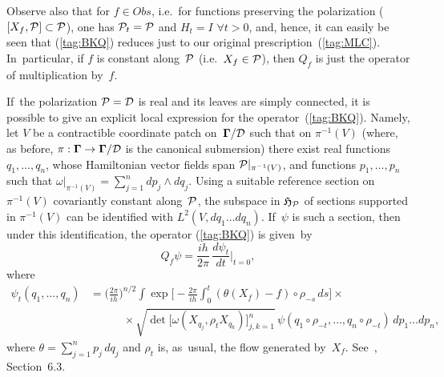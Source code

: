 \documentclass[11pt]{amsart}
\numberwithin{equation}{section}
\theoremstyle{remark}
\newcommand\Obs{Obs}
\newcommand\Omg{{\bigam}}   %
\newcommand\PP{{\Cal P}}
\newcommand\DD{{\Cal D}}
\newcommand\MD{{\Omg/\DD}}
\newcommand\HH{\mathfrak H}
\newcommand{\bigam}{\mbox{\boldmath $\Gamma$}}
\begin{document}
Observe also that for $f\in\Obs$, i.e.~for functions preserving the
polarization ($[X_f,\PP]\subset\PP$), one has $\PP_t=\PP$ and $H_t=I$ $\forall
t>0$, and, hence, it can easily be seen that (\ref{tag:BKQ}) reduces just to
our original prescription~(\ref{tag:MLC}). In~particular, if $f$ is constant
along~$\PP$ (i.e.~$X_f\in\PP$), then $Q_f$ is just the operator of
multiplication by~$f$.

If~the polarization $\PP=\DD$ is real and its leaves are simply connected, it
is possible to give an explicit local expression for the
operator~(\ref{tag:BKQ}). Namely, let $V$ be a contractible coordinate patch
on~$\MD$ such that on $\pi^{-1}(V)$ (where, as before, $\pi:\Omg\to\MD$ is the
canonical submersion) there exist real functions $q_1,\dots,q_n$, whose
Hamiltonian vector fields span $\PP|_{\pi^{-1}(V)}$, and functions
$p_1,\dots,p_n$ such that $\omega|_{\pi^{-1}(V)} = \sum_{j=1}^n dp_j\wedge
dq_j$. Using a suitable reference section on $\pi^{-1}(V)$ covariantly constant
along~$\PP$, the subspace in $\HH_\PP$ of sections supported in $\pi^{-1}(V)$
can be identified with $L^2(V,dq_1\dots dq_n)$. If~$\psi$ is such a section,
then under this identification, the operator (\ref{tag:BKQ}) is given~by
\begin{equation}  Q_f\psi = \frac{ih}{2\pi} \, \frac{d\psi_t}{dt} \bigg|_{t=0},
\label{tag:SNATa} \end{equation}
where
\begin{equation} \begin{aligned} \psi_t(q_1,\dots,q_n) &=
\bigg(\frac{2\pi}{ih}\bigg)^{n/2} \int
\exp\Big[-\frac{2\pi}{ih}\int_0^t (\theta(X_f)-f)\circ\rho_{-s}\,ds\Big]
\times {} \\ & \qquad\quad {}\times
\sqrt{\det\big[ \omega(X_{q_j},\rho_t X_{q_k}) \big]_{j,k=1}^n}
\,\psi(q_1\circ\rho_{-t},\dots,q_n\circ\rho_{-t}) \, dp_1 \dots dp_n,
\end{aligned}  \label{tag:SNATb}  \end{equation}
where $\theta=\sum_{j=1}^n p_j\,dq_j$ and $\rho_t$ is, as~usual, the flow
generated by~$X_f$. See~\cite{bib:SniaB}, Section~6.3.
\end{document}
